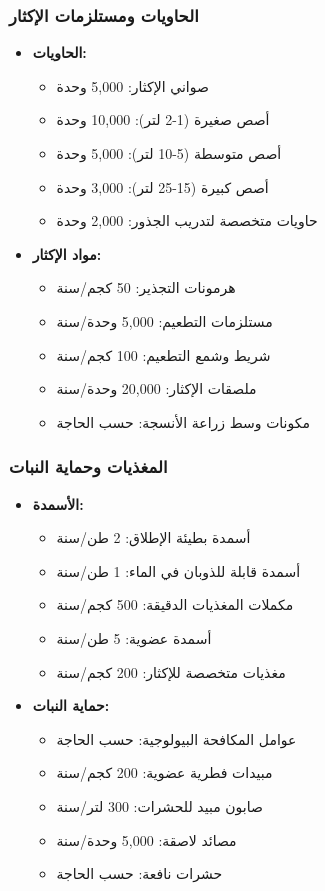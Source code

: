 \subsubsection{الحاويات ومستلزمات الإكثار}
\begin{itemize}
    \item \textbf{الحاويات:}
    \begin{itemize}
        \item صواني الإكثار: 5,000 وحدة
        \item أصص صغيرة (1-2 لتر): 10,000 وحدة
        \item أصص متوسطة (5-10 لتر): 5,000 وحدة
        \item أصص كبيرة (15-25 لتر): 3,000 وحدة
        \item حاويات متخصصة لتدريب الجذور: 2,000 وحدة
    \end{itemize}
    
    \item \textbf{مواد الإكثار:}
    \begin{itemize}
        \item هرمونات التجذير: 50 كجم/سنة
        \item مستلزمات التطعيم: 5,000 وحدة/سنة
        \item شريط وشمع التطعيم: 100 كجم/سنة
        \item ملصقات الإكثار: 20,000 وحدة/سنة
        \item مكونات وسط زراعة الأنسجة: حسب الحاجة
    \end{itemize}
\end{itemize}

\subsubsection{المغذيات وحماية النبات}
\begin{itemize}
    \item \textbf{الأسمدة:}
    \begin{itemize}
        \item أسمدة بطيئة الإطلاق: 2 طن/سنة
        \item أسمدة قابلة للذوبان في الماء: 1 طن/سنة
        \item مكملات المغذيات الدقيقة: 500 كجم/سنة
        \item أسمدة عضوية: 5 طن/سنة
        \item مغذيات متخصصة للإكثار: 200 كجم/سنة
    \end{itemize}
    
    \item \textbf{حماية النبات:}
    \begin{itemize}
        \item عوامل المكافحة البيولوجية: حسب الحاجة
        \item مبيدات فطرية عضوية: 200 كجم/سنة
        \item صابون مبيد للحشرات: 300 لتر/سنة
        \item مصائد لاصقة: 5,000 وحدة/سنة
        \item حشرات نافعة: حسب الحاجة
    \end{itemize}
\end{itemize}

